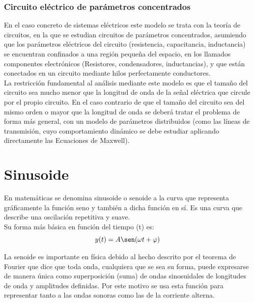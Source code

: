 \documentclass[]{article}
\begin{document}
\subsubsection{Circuito eléctrico de parámetros concentrados} 

En el caso concreto de sistemas eléctricos este modelo se trata con la teoría de circuitos, en la que se estudian circuitos de parámetros concentrados, asumiendo que los parámetros eléctricos del circuito (resistencia, capacitancia, inductancia) se encuentran confinados a una región pequeña del espacio, en los llamados componentes electrónicos (Resistores, condensadores, inductancias), y que están conectados en un circuito mediante hilos perfectamente conductores.\\

La restricción fundamental al análisis mediante este modelo es que el tamaño del circuito sea mucho menor que la longitud de onda de la señal eléctrica que circule por el propio circuito. En el caso contrario de que el tamaño del circuito sea del mismo orden o mayor que la longitud de onda se deberá tratar el problema de forma más general, con un modelo de parámetros distribuidos (como las líneas de transmisión, cuyo comportamiento dinámico se debe estudiar aplicando directamente las Ecuaciones de Maxwell).\cite{CircuitoParametrosConcentrados}\\ 

\section{Sinusoide}

En matemáticas se denomina sinusoide o senoide a la curva que representa gráficamente la función seno y también a dicha función en sí. Es una curva que describe una oscilación repetitiva y suave.\\

Su forma más básica en función del tiempo (t) es:\cite{Sinusoide}\\

\begin{equation}
y(t) = A\sen(\omega t + \varphi)
\end{equation}

La senoide es importante en física debido al hecho descrito por el teorema de Fourier que dice que toda onda, cualquiera que se sea su forma, puede expresarse de manera única como superposición (suma) de ondas sinosuidales de longitudes de onda y amplitudes definidas. Por este motivo se usa esta función para representar tanto a las ondas sonoras como las de la corriente alterna.\cite{Sinusoide}\\
\end{document}
